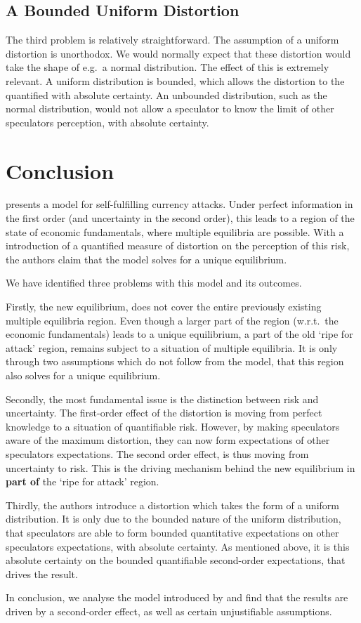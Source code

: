 \begin{refsection}
\subsection{A Bounded Uniform Distortion}
The third problem is relatively straightforward.
The assumption of a uniform distortion is unorthodox.
We would normally expect that these distortion would take the shape of e.g.~a normal distribution.
The effect of this is extremely relevant.
A uniform distribution is bounded,
which allows the distortion to the quantified with absolute certainty.
An unbounded distribution, such as the normal distribution,
would not allow a speculator to know the limit of other speculators perception,
with absolute certainty.

\section{Conclusion}
\textcite{morris1998unique} presents a model for self-fulfilling currency attacks.
Under perfect information in the first order (and uncertainty in the second order),
this leads to a region of the state of economic fundamentals, where multiple equilibria are possible.
With a introduction of a quantified measure of distortion on the perception of this risk,
the authors claim that the model solves for a unique equilibrium.

We have identified three problems with this model and its outcomes.

Firstly, the new equilibrium, does not cover the entire previously existing multiple equilibria region.
Even though a larger part of the region (w.r.t.~the economic fundamentals) leads to a unique equilibrium,
a part of the old `ripe for attack' region, remains subject to a situation of multiple equilibria.
It is only through two assumptions which do not follow from the model,
that this region also solves for a unique equilibrium.

Secondly, the most fundamental issue is the distinction between risk and uncertainty.
The first-order effect of the distortion is moving from perfect knowledge to a situation of quantifiable risk.
However, by making speculators aware of the maximum distortion,
they can now form expectations of other speculators expectations.
The second order effect, is thus moving from uncertainty to risk.
This is the driving mechanism behind the new equilibrium in \textbf{part of} the `ripe for attack' region.

Thirdly, the authors introduce a distortion which takes the form of a uniform distribution.
It is only due to the bounded nature of the uniform distribution,
that speculators are able to form bounded quantitative expectations on other speculators expectations, with absolute certainty.
As mentioned above, it is this absolute certainty on the bounded quantifiable second-order expectations,
that drives the result.

In conclusion, we analyse the model introduced by \textcite{morris1998unique} and find that the results are driven by a second-order effect, as well as certain unjustifiable assumptions.


\nocite{taleb2010black}
\printbibliography

\end{refsection}